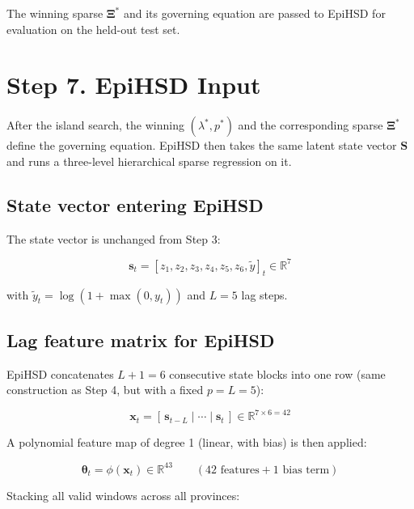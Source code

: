 \documentclass{article}
\begin{document}
The winning sparse $\boldsymbol{\Xi}^*$ and its governing equation are passed to EpiHSD for
evaluation on the held-out test set.

\section*{Step 7. EpiHSD Input}

After the island search, the winning $(\lambda^*, p^*)$ and the corresponding sparse
$\boldsymbol{\Xi}^*$ define the governing equation.
EpiHSD then takes the same latent state vector $\mathbf{S}$ and runs a three-level
hierarchical sparse regression on it.

\subsection*{State vector entering EpiHSD}

The state vector is unchanged from Step 3:

\begin{equation}
    \mathbf{s}_t = [z_1, z_2, z_3, z_4, z_5, z_6, \tilde{y}]_t \in \mathbb{R}^7
\end{equation}

with $\tilde{y}_t = \log(1 + \max(0, y_t))$ and $L = 5$ lag steps.

\subsection*{Lag feature matrix for EpiHSD}

EpiHSD concatenates $L+1 = 6$ consecutive state blocks into one row
(same construction as Step 4, but with a fixed $p = L = 5$):

\begin{equation}
    \mathbf{x}_t
    = [\,\mathbf{s}_{t-L} \mid \cdots \mid \mathbf{s}_t\,]
    \in \mathbb{R}^{7 \times 6 = 42}
\end{equation}

A polynomial feature map of degree 1 (linear, with bias) is then applied:

\begin{equation}
    \boldsymbol{\theta}_t = \phi(\mathbf{x}_t) \in \mathbb{R}^{43}
    \qquad (\text{42 features} + \text{1 bias term})
\end{equation}

Stacking all valid windows across all provinces:
\end{document}
